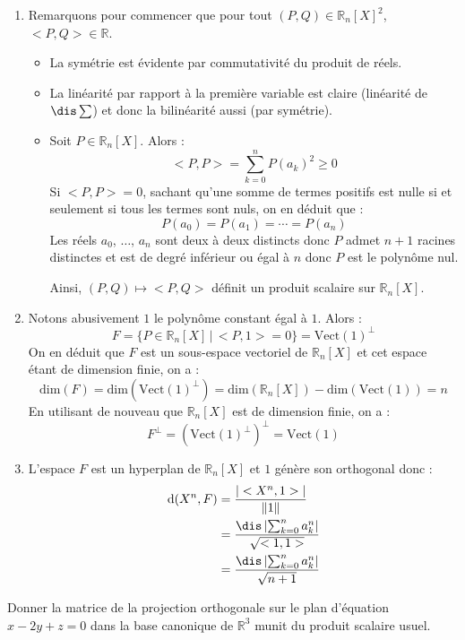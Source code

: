 \documentclass[a4paper,10pt]{report}
\begin{document}
\corr \begin{enumerate}
\item Remarquons pour commencer que pour tout $(P,Q) \in \mathbb{R}_n[X]^2$, $<P,Q> \in \mathbb{R}$.
\begin{itemize}
\item La symétrie est évidente par commutativité du produit de réels.
\item La linéarité par rapport à la première variable est claire (linéarité de $\dis \sum$) et donc la bilinéarité aussi (par symétrie).
\item Soit $P \in \mathbb{R}_n[X]$. Alors :
$$ <P,P> =  \sum_{k=0}^n P(a_k)^2 \geq 0$$
Si $<P,P>=0$, sachant qu'une somme de termes positifs est nulle si et seulement si tous les termes sont nuls, on en déduit que :
$$ P(a_0)= P(a_1) = \cdots = P(a_n)$$
Les réels $a_0$, $\ldots$, $a_n$ sont deux à deux distincts donc $P$ admet $n+1$ racines distinctes et est de degré inférieur ou égal à $n$ donc $P$ est le polynôme nul.

\medskip

\noindent Ainsi, $(P,Q) \mapsto <P,Q>$ définit un produit scalaire sur $\mathbb{R}_n[X]$.
\end{itemize}
\item Notons abusivement $1$ le polynôme constant égal à $1$. Alors :
$$ F = \lbrace P \in \mathbb{R}_n[X] \, \vert \, <P,1>= 0 \rbrace = \textrm{Vect}(1)^{\perp}$$
On en déduit que $F$ est un sous-espace vectoriel de $ \mathbb{R}_n[X]$ et cet espace étant de dimension finie, on a :
$$ \textrm{dim}(F) =  \textrm{dim}(\textrm{Vect}(1)^{\perp}) =  \textrm{dim}(\mathbb{R}_n[X]) -  \textrm{dim}(\textrm{Vect}(1)) = n$$
En utilisant de nouveau que $ \mathbb{R}_n[X]$ est de dimension finie, on a :
$$ F^{\perp} = (\textrm{Vect}(1)^{\perp})^{\perp} = \textrm{Vect}(1)$$
\item L'espace $F$ est un hyperplan de $\mathbb{R}_n[X]$ et $1$ génère son orthogonal donc :
\begin{align*}
\textrm{d}(X^n, F) & = \dfrac{\vert <X^n,1> \vert}{\Vert 1 \Vert} \\
& = \dfrac{\dis\left\vert \sum_{k=0}^n a_k^n \right\vert }{\sqrt{<1,1>}} \\
& = \dfrac{\dis\left\vert \sum_{k=0}^n a_k^n \right\vert }{\sqrt{n+1}} 
\end{align*}
\end{enumerate}

\begin{Exa} Donner la matrice de la projection orthogonale sur le plan d'équation $x-2y+z=0$ dans la base canonique de $\mathbb{R}^3$ munit du produit scalaire usuel.
\end{Exa}
\end{document}
